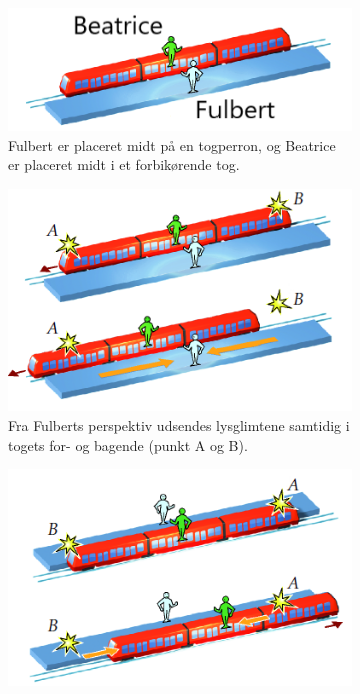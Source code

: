 \begin{figure}[t]
    \centering
    \begin{subfigure}[t]{.3\textwidth}
        \centering
        \includegraphics[width=\columnwidth]{SR/billeder/EinsteinTrainExperiment1.PNG}
        \caption{Fulbert er placeret midt på en togperron, og Beatrice er placeret midt i et forbikørende tog.}
        \label{fig:EinsteinsTrainExperiment1}
    \end{subfigure}
    \hfill
    \begin{subfigure}[t]{.3\textwidth}
        \centering
        \includegraphics[width=\columnwidth]{SR/billeder/EinsteinTrainExperiment2.PNG}
        \caption{Fra Fulberts perspektiv udsendes lysglimtene samtidig i togets for- og bagende (punkt A og B).}
        \label{fig:EinsteinsTrainExperiment2}
    \end{subfigure}
    \hfill
    \begin{subfigure}[t]{.3\textwidth}
        \centering
        \includegraphics[width=\columnwidth]{SR/billeder/EinsteinTrainExperiment3.PNG}

\end{subfigure}
\end{figure}
